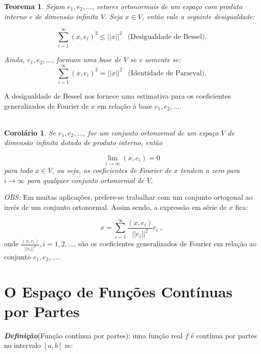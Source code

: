 \documentclass[a4paper,portuguese,9pt,final]{extarticle}
\newtheorem{theorem}{Teorema}[section]
\newtheorem{corollary}{Corolário}[section]
\begin{document}
\begin{multicols*}{2}
                
            \begin{theorem}

                Sejam $ e_{1}, e_{2}, ... $, vetores ortonormais de um espaço com produto interno e de dimensão infinita $ V $. Seja $ x \in V $, então vale a seguinte desigualdade:

                $$  \sum_{i=1}^{\infty} (x,e_{i})^{2} \leq ||x||^{2} \ \ \mbox{   (Desigualdade de Bessel).}$$


                Ainda, $ e_{1}, e_{2}, ... $, formam uma base de $V$ se e somente se:
                $$  \sum_{i=1}^{\infty} (x,e_{i})^{2} = ||x||^{2} \ \ \mbox{ (Identidade de  Parseval).}$$ 
            \end{theorem}


            A desigualdade de Bessel nos fornece uma estimativa para os coeficientes generalizados de Fourier de $x$ em relação à base $ e_{1}, e_{2}, ... $.  \\ \\

            \begin{corollary}
                Se $ e_{1}, e_{2}, ... $, for um conjunto ortonormal de um espaço $V$ de dimensão infinita dotado de produto interno, então

                $$  \lim\limits_{i\to\infty} (x,e_{i})=0  $$
                para todo $ x \in V $, ou seja, os coeficientes de Fourier de $x$ tendem a zero para $i\to\infty$ para qualquer conjunto ortonormal de $V$. \\
            \end{corollary}


            \textit{OBS:} Em muitas aplicações, prefere-se trabalhar com um conjunto ortogonal ao invés de um conjunto ortonormal. Assim sendo, a expressão em série de $x$ fica:

            $$  x=\sum_{i=1}^{\infty} \frac{(x,e_{i})}{||e_{i}||^{2}} e_{i} \ ,  $$ onde $ \displaystyle \frac{(x,e_{i})}{||e_{i}||^{2}}, i=1,2,... $, são os coeficientes generalizados de Fourier em relação ao conjunto $ e_{1}, e_{2}, ... $. \\


    \section{O Espaço de Funções Contínuas por Partes}

        \textbf{\textit{Definição}}(Função contínua por partes): uma função real $f$ é contínua por partes no intervalo $[a,b]$ se:



\end{multicols*}
\end{document}
